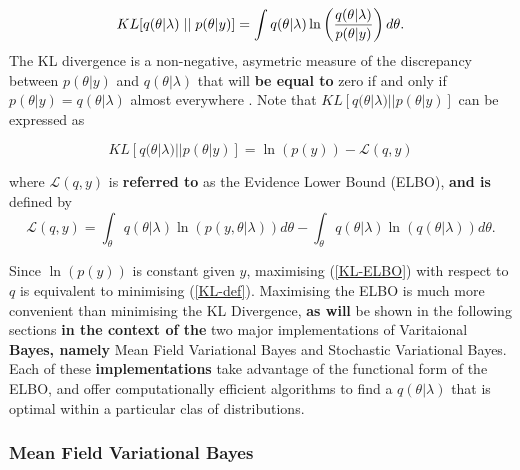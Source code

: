 \documentclass[12pt,a4paper]{article}%
\numberwithin{equation}{section}
\begin{document}
\begin{equation}
\label{KL-def}
KL[q(\theta | \lambda) \hspace{.1cm}||\hspace{.1cm}p(\theta | y)] = \int q(\theta | \lambda) \ln \left( \frac{q(\theta | \lambda)}{p(\theta | y)}\right) d\theta.
\end{equation}
The KL divergence is a non-negative, asymetric %
 measure of the discrepancy between $p(\theta | y)$ and $q(\theta | \lambda)$ that will {\bf be equal to} zero if and only if $p(\theta | y) = q(\theta | \lambda)$ almost everywhere \citep{Bishop2006}. Note that $KL[q(\theta | \lambda)||p(\theta | y)]$ can be expressed as

\begin{equation}
\label{KL-ELBO}
KL[q(\theta | \lambda)||p(\theta | y)] = \ln(p(y)) - \mathcal{L}(q, y)
\end{equation}

where $\mathcal{L}(q, y)$ is {\bf referred to} as the Evidence Lower Bound (ELBO), {\bf and is} defined by
\begin{equation}
\label{ELBO}
\mathcal{L}(q, y) = \int_{\theta} q(\theta|\lambda) \ln (p(y, \theta|\lambda)) d\theta -  \int_{\theta} q(\theta|\lambda) \ln (q(\theta|\lambda)) d\theta.
\end{equation}

Since $\ln(p(y))$ is constant given $y$, maximising (\ref{KL-ELBO}) with respect to $q$ is equivalent to minimising (\ref{KL-def}). Maximising the ELBO is much more convenient than minimising the KL Divergence, {\bf as will} be shown in the following sections {\bf in the context of the} two major implementations of Varitaional %
{\bf Bayes, namely} Mean Field Variational Bayes and Stochastic Variational Bayes. Each of these {\bf implementations} take advantage of the functional form of the ELBO, %
and offer computationally efficient algorithms to find a $q(\theta | \lambda)$ that is optimal within a particular clas %
of distributions. 

\subsubsection{Mean Field Variational Bayes} 
\end{document}
